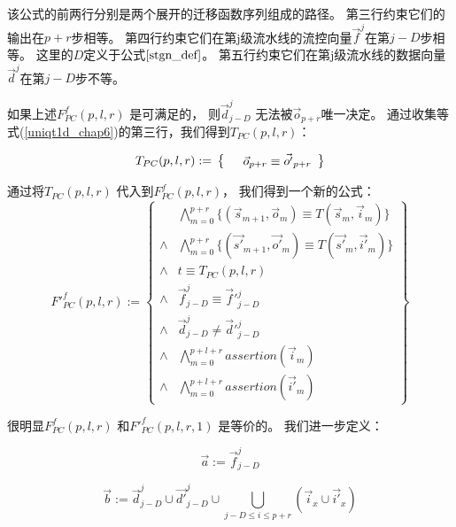 该公式的前两行分别是两个展开的迁移函数序列组成的路径。
第三行约束它们的输出在$p+r$步相等。
第四行约束它们在第j级流水线的流控向量$\vec{f}^j$在第$j-D$步相等。
这里的$D$定义于公式$\ref{stgn_def}$。
第五行约束它们在第j级流水线的数据向量$\vec{d}^j$在第$j-D$步不等。

如果上述$F^f_{PC}(p,l,r)$ 是可满足的，
则$\vec{d}^j_{j-D}$ 无法被$\vec{o}_{p+r}$唯一决定。
通过收集等式(\ref{uniqt1d_chap6})的第三行，我们得到$T_{PC}(p,l,r)$：

\begin{equation}\label{tpc_chap6}
T_{PC}(p,l,r):=\\
\left\{
\begin{array}{cc}
      &\vec{o}_{p+r}\equiv \vec{o'}_{p+r} \\
\end{array}
\right\}
\end{equation}

通过将$T_{PC}(p,l,r)$ 代入到$F^f_{PC}(p,l,r)$，
我们得到一个新的公式：
\begin{equation}\label{fpcq_chap6}
F'^f_{PC}(p,l,r):=
\left\{
\begin{array}{cc}
&\bigwedge_{m=0}^{p+r}
\{
(\vec{s}_{m+1},\vec{o}_m)\equiv T(\vec{s}_m,\vec{i}_m)
\}
\\
\wedge&\bigwedge_{m=0}^{p+r}
\{
(\vec{s'}_{m+1},\vec{o'}_m)\equiv T(\vec{s'}_m,\vec{i'}_m)
\}
\\
\wedge& t\equiv T_{PC}(p,l,r)\\
\wedge& \vec{f}^j_{j-D}\equiv \vec{f}'^j_{j-D} \\
\wedge& \vec{d}^j_{j-D}\ne \vec{d}'^j_{j-D} \\
\wedge&\bigwedge_{m=0}^{p+l+r}assertion(\vec{i}_m) \\
\wedge&\bigwedge_{m=0}^{p+l+r}assertion(\vec{i'}_m)
\end{array}
\right\}
\end{equation}


很明显$F^f_{PC}(p,l,r)$ 和$F'^f_{PC}(p,l,r,1)$ 是等价的。
我们进一步定义：

\begin{equation}\label{pcdef1_chap6}
\vec{a}:=\vec{f}^j_{j-D}
\end{equation}

\begin{equation}\label{pcdef2_chap6}
\vec{b}:=\vec{d}^j_{j-D}\cup \vec{d'}^j_{j-D}\cup \bigcup_{j-D\le i\le p+r}(\vec{i}_{x}\cup\vec{i'}_{x})
\end{equation}


